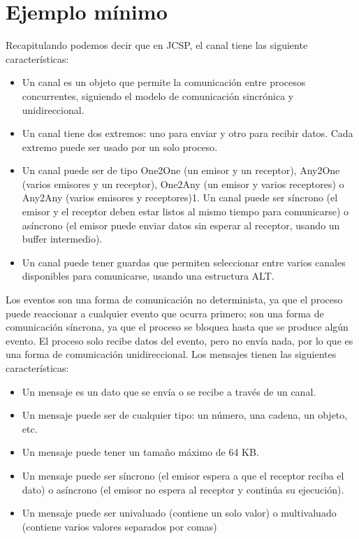\section*{Ejemplo mínimo}
Recapitulando podemos decir que en JCSP, el canal tiene las siguiente características:
\begin{itemize}
	\item Un canal es un objeto que permite la comunicación entre procesos concurrentes, siguiendo el modelo de comunicación sincrónica y unidireccional.
	
	\item Un canal tiene dos extremos: uno para enviar y otro para recibir datos. Cada extremo puede ser usado por un solo proceso.
	
	\item Un canal puede ser de tipo One2One (un emisor y un receptor), Any2One (varios emisores y un receptor), One2Any (un emisor y varios receptores) o Any2Any (varios emisores y receptores)1.
	Un canal puede ser síncrono (el emisor y el receptor deben estar listos al mismo tiempo para comunicarse) o asíncrono (el emisor puede enviar datos sin esperar al receptor, usando un buffer intermedio).
	
	\item Un canal puede tener guardas que permiten seleccionar entre varios canales disponibles para comunicarse, usando una estructura ALT.
\end{itemize}

\noindent Los eventos son una forma de comunicación no determinista, ya que el proceso puede reaccionar a cualquier evento que ocurra primero; son una forma de comunicación síncrona, ya que el proceso se bloquea hasta que se produce algún evento. El proceso solo recibe datos del evento, pero no envía nada, por lo que es una forma de comunicación unidireccional. Los mensajes tienen las siguientes características:
\begin{itemize}
	\item Un mensaje es un dato que se envía o se recibe a través de un canal.
	
	\item Un mensaje puede ser de cualquier tipo: un número, una cadena, un objeto, etc.
	
	\item Un mensaje puede tener un tamaño máximo de 64 KB.
	
	\item Un mensaje puede ser síncrono (el emisor espera a que el receptor reciba el dato) o asíncrono (el emisor no espera al receptor y continúa su ejecución).
	
	\item Un mensaje puede ser univaluado (contiene un solo valor) o multivaluado (contiene varios valores separados por comas)
\end{itemize}

